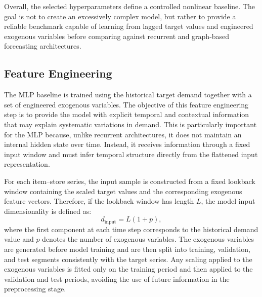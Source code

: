 Overall, the selected hyperparameters define a controlled nonlinear baseline. The goal is not to create an excessively complex model, but rather to provide a reliable benchmark capable of learning from lagged target values and engineered exogenous variables before comparing against recurrent and graph-based forecasting architectures.
\subsection{Feature Engineering}
\label{subsec:mlp_feature_engineering}

The MLP baseline is trained using the historical target demand together with a set of engineered exogenous variables. The objective of this feature engineering step is to provide the model with explicit temporal and contextual information that may explain systematic variations in demand. This is particularly important for the MLP because, unlike recurrent architectures, it does not maintain an internal hidden state over time. Instead, it receives information through a fixed input window and must infer temporal structure directly from the flattened input representation.

For each item--store series, the input sample is constructed from a fixed lookback window containing the scaled target values and the corresponding exogenous feature vectors. Therefore, if the lookback window has length \(L\), the model input dimensionality is defined as:
\[
d_{\text{input}} = L(1+p),
\]
where the first component at each time step corresponds to the historical demand value and \(p\) denotes the number of exogenous variables. The exogenous variables are generated before model training and are then split into training, validation, and test segments consistently with the target series. Any scaling applied to the exogenous variables is fitted only on the training period and then applied to the validation and test periods, avoiding the use of future information in the preprocessing stage.

